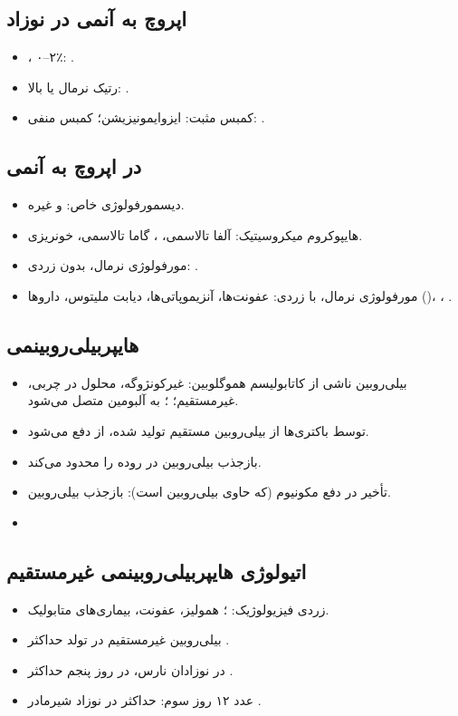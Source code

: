 \documentclass[12pt,a4paper]{article}
\begin{document}
\subsection*{اپروچ به آنمی در نوزاد}
\begin{itemize}
\item {}، ۰–۲٪: .
\item رتیک نرمال یا بالا: .
\item کمبس مثبت: ایزوایمونیزیشن؛ کمبس منفی: .
\end{itemize}

\subsection*{ در اپروچ به آنمی}
\begin{itemize}
\item دیسمورفولوژی خاص:  و غیره.
\item هایپوکروم میکروسیتیک: آلفا تالاسمی، ، گاما تالاسمی، خونریزی.
\item مورفولوژی نرمال، بدون زردی: .
\item مورفولوژی نرمال، با زردی: عفونت‌ها، آنزیموپاتی‌ها، دیابت ملیتوس، داروها
()، ، .
\end{itemize}
\subsection*{هایپربیلی‌روبینمی}
\begin{itemize}
\item بیلی‌روبین ناشی از کاتابولیسم هموگلوبین: غیرکونژوگه، محلول در چربی، غیرمستقیم؛
؛ به آلبومین متصل می‌شود.
\item {} توسط باکتری‌ها از بیلی‌روبین مستقیم تولید شده،
از  دفع می‌شود.
\item بازجذب بیلی‌روبین در روده را محدود می‌کند.
\item تأخیر در دفع مکونیوم (که حاوی بیلی‌روبین است): بازجذب بیلی‌روبین.
\item {}
\end{itemize}
\subsection*{اتیولوژی هایپربیلی‌روبینمی غیرمستقیم}
\begin{itemize}
\item[۱)] زردی فیزیولوژیک: ؛ همولیز، عفونت، بیماری‌های متابولیک.
\item بیلی‌روبین غیرمستقیم در  تولد حداکثر .
\item در نوزادان نارس، در روز پنجم حداکثر .
\item عدد ۱۲ روز سوم: حداکثر در نوزاد شیرمادر .
\end{itemize}
\end{document}
